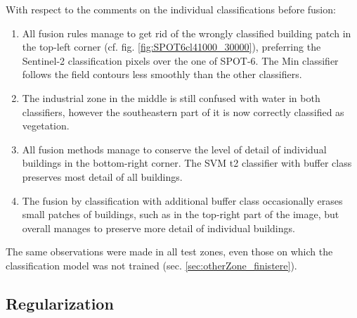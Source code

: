\documentclass[10pt]{article}
\newcommand{\tile}{41000_30000}
\begin{document}
With respect to the comments on the individual classifications before fusion:
\begin{enumerate}
    \item All fusion rules manage to get rid of the wrongly classified building patch in the top-left corner (cf. fig. \ref{fig:SPOT6cl\tile}), preferring the Sentinel-2 classification pixels over the one of SPOT-6. The Min classifier follows the field contours less smoothly than the other classifiers.
    \item The industrial zone in the middle is still confused with water in both classifiers, however the southeastern part of it is now correctly classified as vegetation.
    \item All fusion methods manage to conserve the level of detail of individual buildings in the bottom-right corner. The SVM t2 classifier with buffer class preserves most detail of all buildings.
    \item The fusion by classification with additional buffer class occasionally erases small patches of buildings, such as in the top-right part of the image, but overall manages to preserve more detail of individual buildings.
\end{enumerate}
The same observations were made in all test zones, even those on which the classification model was not trained (sec. \ref{sec:otherZone_finistere}).

\subsection{Regularization}
\end{document}
